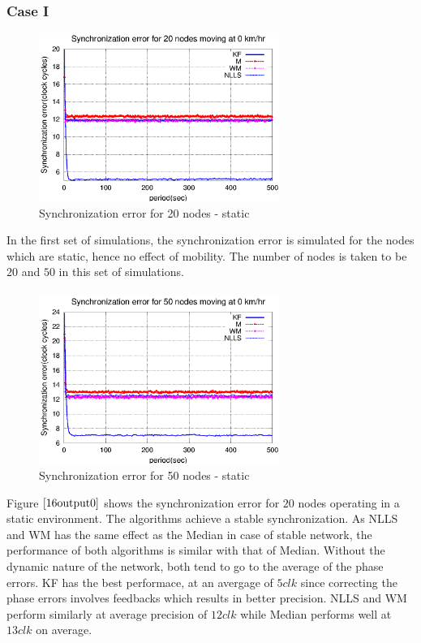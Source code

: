 \documentclass[a4paper,10pt]{report}
\begin{document}
\subsubsection{\textbf{Case I}}
\begin{figure}[!h]
\centering
\includegraphics[width= 0.7\textwidth]{16output-s0}
\caption{Synchronization error for 20 nodes - static} \label{16output0}
\end{figure}
In the first set of simulations, the synchronization error is simulated for the nodes which are static, hence no effect of mobility. The number of nodes is taken to be $20$ and $50$ in this set of simulations.  \paragraph*{}
\begin{figure}
\centering
\includegraphics[width= 0.7\textwidth]{50output-s0}
\caption{Synchronization error for 50 nodes - static} \label{50output0}
\end{figure}
Figure $\ref{16output0}$ shows the synchronization error for $20$ nodes operating in a static environment. The algorithms achieve a stable synchronization. As NLLS and WM has the same effect as the Median in case of stable network, the performance of both algorithms is similar with that of Median. Without the dynamic nature of the network, both tend to go to the average of the phase errors. KF has the best performace, at an avergage of $5clk$ since correcting the phase errors involves feedbacks which results in better precision. NLLS and WM perform similarly at average precision of $12clk$ while Median performs well at $13clk$ on average.\paragraph*{}
\end{document}
